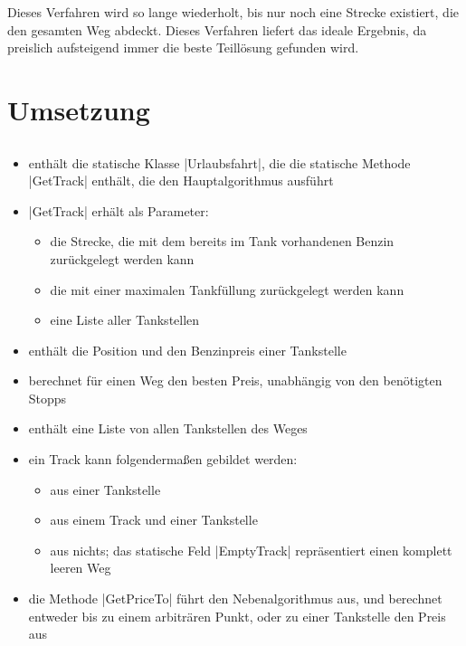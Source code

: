 \documentclass[a4paper,10pt,ngerman]{scrartcl}
\begin{document}
Dieses Verfahren wird so lange wiederholt, bis nur noch eine Strecke existiert, die den gesamten Weg abdeckt. Dieses Verfahren liefert das ideale Ergebnis, da preislich aufsteigend immer die beste Teillösung gefunden wird. 

\section{Umsetzung}

\subsection{}
	\begin{itemize}
		\item enthält die statische Klasse |Urlaubsfahrt|, die die statische Methode |GetTrack| enthält, die den Hauptalgorithmus ausführt
		\item |GetTrack| erhält als Parameter:
		 \begin{itemize}
		 	\item die Strecke, die mit dem bereits im Tank vorhandenen Benzin zurückgelegt werden kann
		 	\item die mit einer maximalen Tankfüllung zurückgelegt werden kann
		 	\item eine Liste aller Tankstellen
		\end{itemize}
    \end{itemize}
    
    \begin{itemize}
        \item enthält die Position und den Benzinpreis einer Tankstelle
    \end{itemize}

	\begin{itemize}
		\item berechnet für einen Weg den besten Preis, unabhängig von den benötigten Stopps
		\item enthält eine Liste von allen Tankstellen des Weges
		\item ein Track kann folgendermaßen gebildet werden:
		\begin{itemize}
			\item aus einer Tankstelle
			\item aus einem Track und einer Tankstelle
			\item aus nichts; das statische Feld |EmptyTrack| repräsentiert einen komplett leeren Weg
		\end{itemize}
        \item die Methode |GetPriceTo| führt den Nebenalgorithmus aus, und berechnet entweder bis zu einem arbiträren Punkt, oder zu einer Tankstelle den Preis aus
    \end{itemize}
\end{document}
